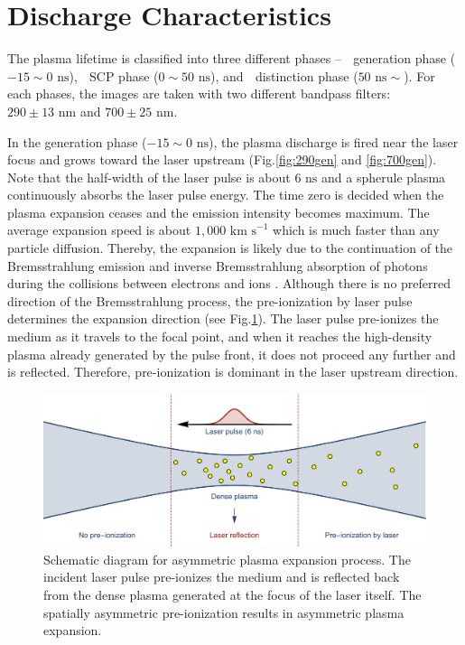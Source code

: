 \section{Discharge Characteristics}
\label{sec:ch4-2}

The plasma lifetime is classified into three different phases -- \textcircled{} generation phase ($-15 \sim 0 \text{ ns}$), \textcircled{} SCP phase ($0 \sim 50 \text{ ns}$), and \textcircled{} distinction phase ($50 \text{ ns} \sim$). For each phases, the images are taken with two different bandpass filters: $290\pm13 \text{ nm}$ and $700\pm25 \text{ nm}$.

In the generation phase ($-15 \sim 0 \text{ ns}$), the plasma discharge is fired near the laser focus and grows toward the laser upstream (Fig.\ref{fig:290gen} and \ref{fig:700gen}). Note that the half-width of the laser pulse is about $6 \text{ ns}$ and a spherule plasma continuously absorbs the laser pulse energy. The time zero is decided when the plasma expansion ceases and the emission intensity becomes maximum. The average expansion speed is about $1,000 \text{ km s}^{-1}$ which is much faster than any particle diffusion. Thereby, the expansion is likely due to the continuation of the Bremsstrahlung emission and inverse Bremsstrahlung absorption of photons during the collisions between electrons and ions \cite{bataller2016observation}. Although there is no preferred direction of the Bremsstrahlung process, the pre-ionization by laser pulse determines the expansion direction (see Fig.\ref{fig:ionizationWave}). The laser pulse pre-ionizes the medium as it travels to the focal point, and when it reaches the high-density plasma already generated by the pulse front, it does not proceed any further and is reflected. Therefore, pre-ionization is dominant in the laser upstream direction.

\begin{figure}[ht!]
\centering
\includegraphics[width=130mm]{figures/ch4/ionization/ionizationWave.pdf}
\caption{Schematic diagram for asymmetric plasma expansion process. The incident laser pulse pre-ionizes the medium and is reflected back from the dense plasma generated at the focus of the laser itself. The spatially asymmetric pre-ionization results in asymmetric plasma expansion.}
\label{fig:ionizationWave}
\end{figure}

